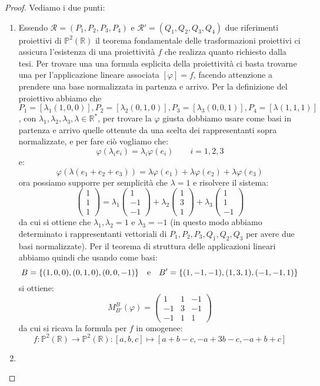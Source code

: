 \documentclass[12pt]{article}
\theoremstyle{remark}
\theoremstyle{definition}
\newenvironment{solution}{\renewcommand{\proofname}{Soluzione}\begin{proof}}{\end{proof}}
\newcommand{\RR}{\mathbb{R}}
\newcommand{\PP}{\mathbb{P}}
\begin{document}
\begin{solution}
  Vediamo i due punti:
  \begin{enumerate}[(1)]
    \item Essendo $\mathscr{R} = (P_1,P_2,P_3,P_4)$ e $\mathscr{R}' = (Q_1,Q_2,Q_3,Q_4)$ due riferimenti proiettivi di $\PP^2(\RR)$ il teorema fondamentale delle trasformazioni proiettivi ci assicura l'esistenza di una proiettività $f$ che realizza quanto richiesto dalla tesi. Per trovare una 
    una formula esplicita della proiettività ci basta trovarne una per l'applicazione lineare associata $[\varphi] = f$, facendo attenzione a prendere una base normalizzata in partenza e arrivo. Per la definizione del proiettivo abbiamo che $P_1 = [\lambda_1(1,0,0)], P_2 = [\lambda_2(0,1,0)], P_3 = [\lambda_3(0,0,1)], P_4 = [\lambda(1,1,1)]$, con $\lambda_1,\lambda_2,\lambda_3,\lambda \in \RR^*$,
    per trovare la $\varphi$ giusta dobbiamo usare come basi in partenza e arrivo quelle ottenute da una scelta dei rappresentanti sopra normalizzate, e per fare ciò vogliamo che:
    \[ \varphi(\lambda_ie_i) = \lambda_i \varphi(e_i) \qquad i = 1,2,3
      \]
    e:
    \[ \varphi(\lambda(e_1+e_2+e_3)) = \lambda \varphi(e_1) + \lambda \varphi(e_2) + \lambda \varphi(e_3) 
      \]
    ora possiamo supporre per semplicità che $\lambda = 1$ e risolvere il sistema:
    \[ \begin{pmatrix} 1 \\ 1 \\ 1 \end{pmatrix} = \lambda_1 \begin{pmatrix} 1 \\ -1 \\ - 1\end{pmatrix} + \lambda_2 \begin{pmatrix} 1 \\ 3 \\ 1 \end{pmatrix} + \lambda_3 \begin{pmatrix} 1 \\ 1 \\ - 1\end{pmatrix}
      \]
    da cui si ottiene che $\lambda_1,\lambda_2 = 1$ e $\lambda_3 = -1$ (in questo modo abbiamo determinato i rappresentanti vettoriali di $P_1,P_2,P_3,Q_1,Q_2,Q_3$ per avere due basi normalizzate). Per il teorema di struttura delle applicazioni lineari abbiamo quindi che usando come basi:
    \[ B = \{(1,0,0),(0,1,0),(0,0,-1)\} \quad \text e \quad B' = \{(1,-1,-1),(1,3,1),(-1,-1,1)\}
      \]
    si ottiene:
    \[ M_{B'}^{B}(\varphi) = \begin{pmatrix} 1 & 1 & -1 \\ -1 & 3 & -1 \\ -1 & 1 & 1\end{pmatrix}
      \]
    da cui si ricava la formula per $f$ in omogenee:
    \[ f : \PP^2(\RR) \longrightarrow \PP^2(\RR) : [a,b,c] \longmapsto [a+b-c,-a+3b-c,-a+b+c]
      \]
    \item
  \end{enumerate}
\end{solution}
\end{document}
